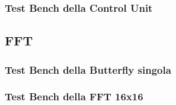 \subsubsection{Test Bench della Control Unit}



\subsection{FFT}



\subsubsection{Test Bench della Butterfly singola}



\subsubsection{Test Bench della FFT 16x16}

